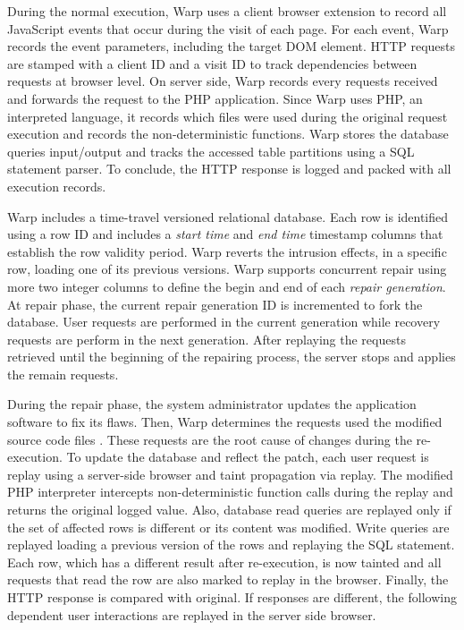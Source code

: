 During the normal execution, Warp uses a client browser extension to record all JavaScript events that occur during the visit of each page. For each event, Warp records the event parameters, including the target \ac{DOM} element. \ac{HTTP} requests are stamped with a client ID and a visit ID to track dependencies between requests at browser level. On server side, Warp records every requests received and forwards the request to the PHP application. Since Warp uses PHP, an interpreted language, it records which files were used during the original request execution and records the non-deterministic functions. Warp stores the database queries input/output and tracks the accessed table partitions using a \ac{SQL} statement parser. To conclude, the \ac{HTTP} response is logged and packed with all execution records.

Warp includes a time-travel versioned relational database. Each row is identified using a row ID and includes a \textit{start time} and \textit{end time} timestamp columns that establish the row validity period. Warp reverts the intrusion effects, in a specific row, loading one of its previous versions. Warp supports concurrent repair using more two integer columns to define the begin and end of each \textit{repair generation}. At repair phase, the current repair generation ID is incremented to fork the database. User requests are performed in the current generation while recovery requests are perform in the next generation. After replaying the requests retrieved until the beginning of the repairing process, the server stops and applies the remain requests.

During the repair phase, the system administrator updates the application software to fix its flaws. Then, Warp determines the requests used the modified source code files \cite{poirot,Wang2011}. These requests are the root cause of changes during the re-execution. To update the database and reflect the patch, each user request is replay using a server-side browser and taint propagation via replay. The modified PHP interpreter intercepts non-deterministic function calls during the replay and returns the original logged value. Also, database read queries are replayed only if the set of affected rows is different or its content was modified. Write queries are replayed loading a previous version of the rows and replaying the \ac{SQL} statement. Each row, which has a different result after re-execution, is now tainted and all requests that read the row are also marked to replay in the browser. Finally, the \ac{HTTP} response is compared with original. If responses are different, the following dependent user interactions are replayed in the server side browser.

